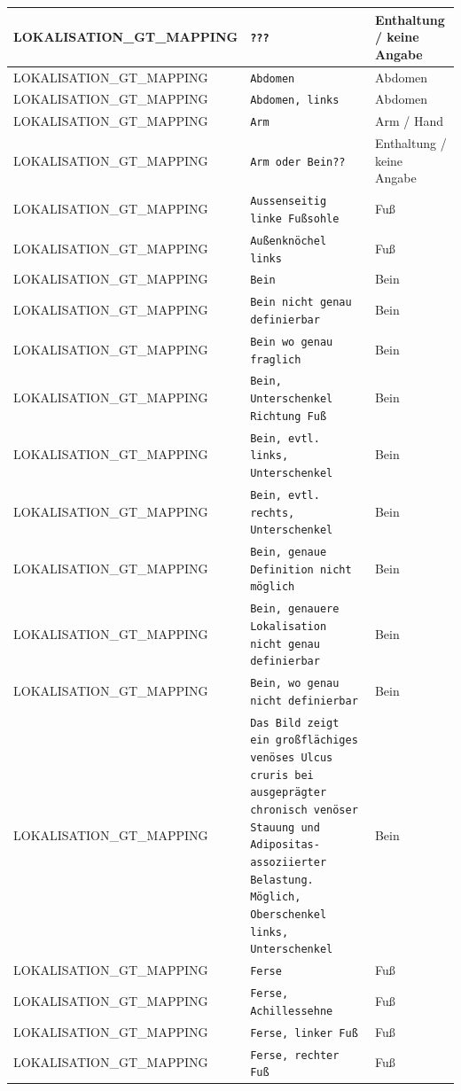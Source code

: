 \begin{longtable}{|p{3.5cm}|p{5cm}|p{6.5cm}|}
LOKALISATION\_GT\_MAPPING & \texttt{???} & Enthaltung / keine Angabe \\ \hline
LOKALISATION\_GT\_MAPPING & \texttt{Abdomen} & Abdomen \\ \hline
LOKALISATION\_GT\_MAPPING & \texttt{Abdomen, links} & Abdomen \\ \hline
LOKALISATION\_GT\_MAPPING & \texttt{Arm} & Arm / Hand \\ \hline
LOKALISATION\_GT\_MAPPING & \texttt{Arm oder Bein??} & Enthaltung / keine Angabe \\ \hline
LOKALISATION\_GT\_MAPPING & \texttt{Aussenseitig linke Fußsohle} & Fuß \\ \hline
LOKALISATION\_GT\_MAPPING & \texttt{Außenknöchel links} & Fuß \\ \hline
LOKALISATION\_GT\_MAPPING & \texttt{Bein} & Bein \\ \hline
LOKALISATION\_GT\_MAPPING & \texttt{Bein nicht genau definierbar} & Bein \\ \hline
LOKALISATION\_GT\_MAPPING & \texttt{Bein wo genau fraglich} & Bein \\ \hline
LOKALISATION\_GT\_MAPPING & \texttt{Bein, Unterschenkel Richtung Fuß} & Bein \\ \hline
LOKALISATION\_GT\_MAPPING & \texttt{Bein, evtl. links, Unterschenkel} & Bein \\ \hline
LOKALISATION\_GT\_MAPPING & \texttt{Bein, evtl. rechts, Unterschenkel} & Bein \\ \hline
LOKALISATION\_GT\_MAPPING & \texttt{Bein, genaue Definition nicht möglich} & Bein \\ \hline
LOKALISATION\_GT\_MAPPING & \texttt{Bein, genauere Lokalisation nicht genau definierbar} & Bein \\ \hline
LOKALISATION\_GT\_MAPPING & \texttt{Bein, wo genau nicht definierbar} & Bein \\ \hline
LOKALISATION\_GT\_MAPPING & \texttt{Das Bild zeigt ein großflächiges venöses Ulcus cruris bei ausgeprägter chronisch venöser Stauung und Adipositas-assoziierter Belastung. Möglich, Oberschenkel links, Unterschenkel} & Bein \\ \hline
LOKALISATION\_GT\_MAPPING & \texttt{Ferse} & Fuß \\ \hline
LOKALISATION\_GT\_MAPPING & \texttt{Ferse, Achillessehne} & Fuß \\ \hline
LOKALISATION\_GT\_MAPPING & \texttt{Ferse, linker Fuß} & Fuß \\ \hline
LOKALISATION\_GT\_MAPPING & \texttt{Ferse, rechter Fuß} & Fuß \\ \hline

\end{longtable}
